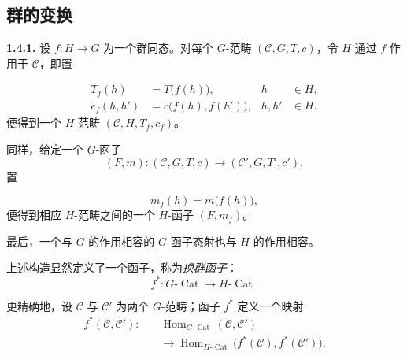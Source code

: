 \clearpage
{}%
\subsection{群的变换}

\noindent\textbf{1.4.1.}\quad
设 $f\colon H\to G$ 为一个群同态。对每个 $G$-范畴
$(\mathcal C,G,T,c)$，令 $H$ 通过 $f$ 作用于 $\mathcal C$，即置

\begin{equation}
  \begin{aligned}
    T_f(h)&=T\bigl(f(h)\bigr),
      & h&\in H,\\
    c_f(h,h')&=c\bigl(f(h),f(h')\bigr),
      & h,h'&\in H.
  \end{aligned}
  \tag{1.4.1.1}
\end{equation}
便得到一个 $H$-范畴 $(\mathcal C,H,T_f,c_f)$。

同样，给定一个 $G$-函子
\[
  (F,m)\colon(\mathcal C,G,T,c)
  \longrightarrow(\mathcal C',G,T',c'),
\]
置

\begin{equation}
  m_f(h)=m\bigl(f(h)\bigr),
  \tag{1.4.1.2}
\end{equation}
便得到相应 $H$-范畴之间的一个 $H$-函子 $(F,m_f)$。

最后，一个与 $G$ 的作用相容的 $G$-函子态射也与 $H$ 的作用相容。

上述构造显然定义了一个函子，称为\emph{换群函子}：
\begin{equation}
  f^*\colon G\text{-}\operatorname{Cat}
  \longrightarrow H\text{-}\operatorname{Cat}.
  \tag{1.4.1.3}
\end{equation}

更精确地，设 $\mathcal C$ 与 $\mathcal C'$ 为两个 $G$-范畴；函子 $f^*$
定义一个映射
\begin{equation}
  \begin{aligned}
    f^*(\mathcal C,\mathcal C')\colon\quad
      &\operatorname{Hom}_{G\text{-}\operatorname{Cat}}
        (\mathcal C,\mathcal C')\\
      &\longrightarrow
        \operatorname{Hom}_{H\text{-}\operatorname{Cat}}
        \bigl(f^*(\mathcal C),f^*(\mathcal C')\bigr).
  \end{aligned}
  \tag{1.4.1.4}
\end{equation}

